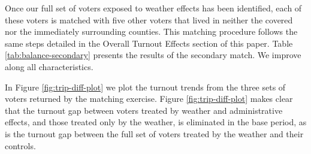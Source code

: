 \documentclass[
  12pt,
]{article}
\begin{document}
Once our full set of voters exposed to weather effects has been identified, each of these voters is matched with five other voters that lived in neither the covered nor the immediately surrounding counties. This matching procedure follows the same steps detailed in the Overall Turnout Effects section of this paper. Table \ref{tab:balance-secondary} presents the results of the secondary match. We improve along all characteristics.

\begin{singlespace}
\begin{table}[!h]

\caption{\label{tab:balance-tab-ll2}\label{tab:balance-secondary} Balance Table for Secondary Match}
\centering
{}
\end{table}
\end{singlespace}

In Figure \ref{fig:trip-diff-plot} we plot the turnout trends from the three sets of voters returned by the matching exercise. Figure \ref{fig:trip-diff-plot} makes clear that the turnout gap between voters treated by weather and administrative effects, and those treated only by the weather, is eliminated in the base period, as is the turnout gap between the full set of voters treated by the weather and their controls.
\end{document}
